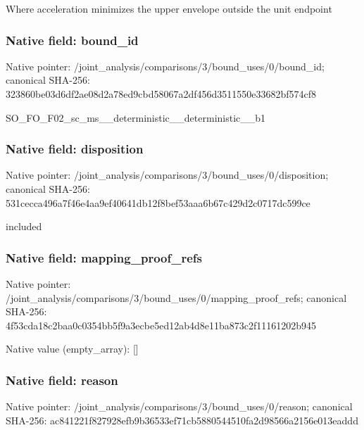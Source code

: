 \documentclass[10pt,a4paper]{article}
\begin{document}
\begingroup\raggedright\sloppy Where acceleration minimizes the upper envelope outside the unit endpoint\par\endgroup

\subsubsection{Native field: bound\_\allowbreak{}id}
Native pointer: /joint\_\allowbreak{}analysis/comparisons/3/bound\_\allowbreak{}uses/0/bound\_\allowbreak{}id; canonical SHA-256: 323860be03d6df2ae08d2a78ed9cbd58067a2df456d3511550e33682bf574cf8

\begingroup\raggedright\sloppy SO\_\allowbreak{}FO\_\allowbreak{}F02\_\allowbreak{}sc\_\allowbreak{}ms\_\allowbreak{}\_\allowbreak{}deterministic\_\allowbreak{}\_\allowbreak{}deterministic\_\allowbreak{}\_\allowbreak{}b1\par\endgroup

\subsubsection{Native field: disposition}
Native pointer: /joint\_\allowbreak{}analysis/comparisons/3/bound\_\allowbreak{}uses/0/disposition; canonical SHA-256: 531cecca496a7f46e4aa9ef40641db12f8bef53aaa6b67c429d2c0717dc599ce

\begingroup\raggedright\sloppy included\par\endgroup

\subsubsection{Native field: mapping\_\allowbreak{}proof\_\allowbreak{}refs}
Native pointer: /joint\_\allowbreak{}analysis/comparisons/3/bound\_\allowbreak{}uses/0/mapping\_\allowbreak{}proof\_\allowbreak{}refs; canonical SHA-256: 4f53cda18c2baa0c0354bb5f9a3ecbe5ed12ab4d8e11ba873c2f11161202b945

Native value (empty\_\allowbreak{}array): []

\subsubsection{Native field: reason}
Native pointer: /joint\_\allowbreak{}analysis/comparisons/3/bound\_\allowbreak{}uses/0/reason; canonical SHA-256: ac841221f827928efb9b36533ef71cb5880544510fa2d98566a2156e013eaddd
\end{document}
